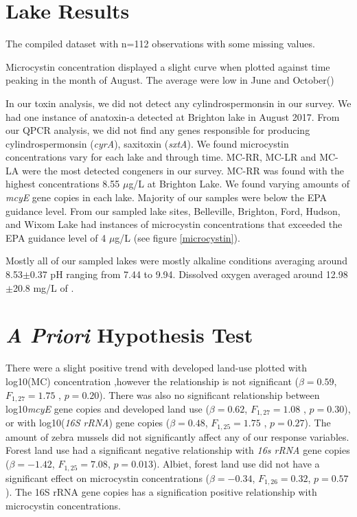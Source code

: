 
\section{Lake Results}

The compiled dataset with n=112 observations with some missing values.


Microcystin concentration displayed a slight curve when plotted against time peaking in the month of August. The average were low in June and October()

In our toxin analysis, we did not detect any cylindrospermonsin in our survey. We had one instance of anatoxin-a detected at Brighton lake in August 2017. From our QPCR analysis, we did not find any genes responsible for producing cylindrospermonsin (\emph{cyrA}), saxitoxin (\emph{sxtA}).  We found microcystin concentrations vary for each lake and through time. MC-RR, MC-LR and MC-LA were the most detected congeners in our survey. MC-RR was found with the highest concentrations 8.55 $\mu$g/L at Brighton Lake. We found varying amounts of \emph{mcyE} gene copies in each lake. Majority of our samples were below the EPA guidance level. From our sampled lake sites, Belleville, Brighton, Ford, Hudson, and Wixom Lake had instances of microcystin concentrations that exceeded the EPA guidance level of 4 $\mu$g/L (see figure \ref{microcystin}).

Mostly all of our sampled lakes were mostly alkaline conditions averaging around 8.53$\pm$0.37 pH ranging from 7.44 to 9.94. Dissolved oxygen averaged around 12.98$\pm$20.8 mg/L of .

\section{\emph{A Priori} Hypothesis Test}

There were a slight positive trend with developed land-use plotted with log10(MC) concentration ,however the relationship is not significant  ($\beta=0.59$, $F_{{1,27}}=1.75$ , $p=0.20$). There was also no significant relationship between log10\emph{mcyE} gene copies and developed land use ($\beta=0.62$, $F_{{1,27}}=1.08$ , $p=0.30$), or with log10(\emph{16S rRNA}) gene copies ($\beta=0.48$, $F_{{1,25}}=1.75$ , $p=0.27$).
The amount  of zebra mussels did not significantly affect any of our response variables.
Forest land use had a significant negative relationship with \emph{16s rRNA} gene copies ($\beta=-1.42$, $F_{{1,25}}=7.08$, $p=0.013$). Albiet, forest land use did not have a significant effect on microcystin concentrations ($\beta=-0.34$, $F_{{1,26}}=0.32$, $p=0.57$).
The 16S rRNA gene copies has a signification positive relationship with microcystin concentrations.

